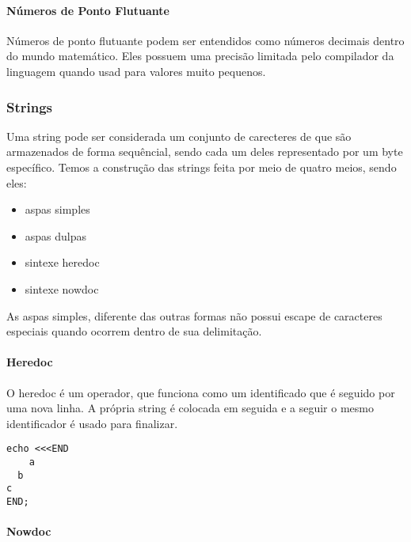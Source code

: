 \documentclass[12pt a4paper]{paper}
\begin{document}
\paragraph{Números de Ponto Flutuante} %
\label{par:Números de Ponto Flutuante}
Números de ponto flutuante podem ser entendidos como números decimais dentro do mundo 
matemático. Eles possuem uma precisão limitada pelo compilador da linguagem quando usad 
para valores muito pequenos.

\subsubsection{Strings} %
\label{sec:Strings}
Uma string pode ser considerada um conjunto de carecteres de que são armazenados de 
forma sequêncial, sendo cada um deles representado por um byte específico. Temos a 
construção das strings feita por meio de quatro meios, sendo eles:

\begin{itemize}
  \item aspas simples
  \item aspas dulpas
  \item sintexe heredoc 
  \item sintexe nowdoc
\end{itemize}

As aspas simples, diferente das outras formas não possui escape de caracteres 
especiais quando ocorrem dentro de sua delimitação.

\paragraph{Heredoc} %
\label{par:Heredoc}
O heredoc é um operador, que funciona como um identificado que é seguido por uma nova 
linha. A própria string é colocada em seguida e a seguir o mesmo identificador é usado 
para finalizar. 

\begin{verbatim}
echo <<<END 
    a
  b
c
END;
\end{verbatim}



\paragraph{Nowdoc} %
\label{par:Nowdoc}












\end{document}
